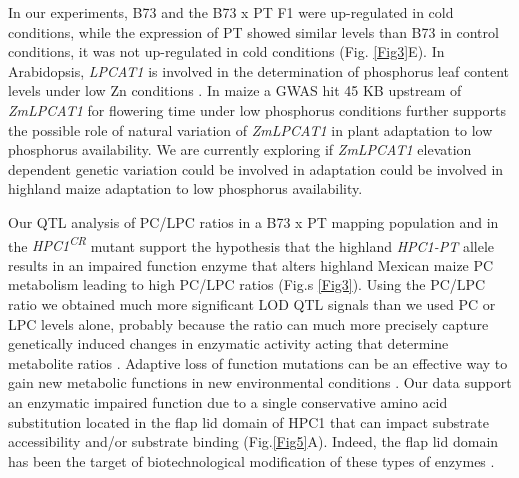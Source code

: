 \documentclass[9pt,twocolumn,twoside,lineno]{BioRxiv}
\begin{document}
In our experiments, B73 and the B73 x PT F1 were up-regulated in cold conditions, while the expression of PT showed similar levels than B73 in control conditions, it was not up-regulated in cold conditions (Fig. \ref{Fig3}E).
In Arabidopsis, \textit{LPCAT1} is involved in the determination of phosphorus leaf content levels under low Zn conditions \cite{Kisko2018-zm}.
In maize a GWAS hit 45 KB upstream of \textit{ZmLPCAT1} for flowering time under low phosphorus conditions further supports the possible role of natural variation of \textit{ZmLPCAT1} in plant adaptation to low phosphorus availability. 
We are currently exploring if \textit{ZmLPCAT1} elevation dependent genetic variation could be involved in adaptation could be involved in highland maize adaptation to low phosphorus availability.

Our QTL analysis of PC/LPC ratios in a B73 x PT mapping population and in the \textit{HPC1\textsuperscript{CR}} mutant support the hypothesis that the highland \textit{HPC1-PT} allele results in an impaired function enzyme that alters highland Mexican maize PC metabolism leading to high PC/LPC ratios (Fig.s \ref{Fig3}). 
Using the PC/LPC ratio we obtained much more significant LOD QTL signals than we used PC or LPC levels alone, probably because the ratio can much more precisely capture genetically induced changes in enzymatic activity acting that determine metabolite ratios \cite{Petersen2012-ii}.
Adaptive loss of function mutations can be an effective way to gain new metabolic functions in new environmental conditions \cite{Hottes2013-np}. 
Our data support an enzymatic impaired function due to a single conservative amino acid substitution located in the flap lid domain of HPC1 that can impact substrate  accessibility and/or substrate binding (Fig.\ref{Fig5}A). 
Indeed, the flap lid domain has been the target of biotechnological modification of these types of enzymes \cite{Khan2017-ua}.
\end{document}
